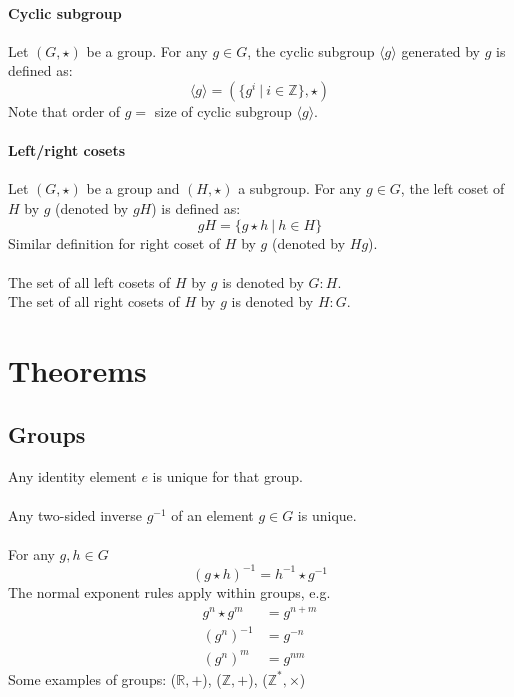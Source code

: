 \documentclass{article}
\newcommand{\R}{\mathbb{R}}
\newcommand{\Z}{\mathbb{Z}}
\begin{document}
\paragraph{Cyclic subgroup}
Let $ (G, \star) $ be a group. For any $ g \in G $, the cyclic subgroup $ \langle g \rangle $ generated by $ g $ is defined as:
\begin{equation}
\langle g \rangle = (\{g^{i} \ | \ i \in \Z \}, \star)
\end{equation}
Note that order of $ g  = $  size of cyclic subgroup $ \langle g \rangle $.
\paragraph{Left/right cosets}
Let $ (G, \star) $ be a group and $ (H, \star) $ a subgroup. For any $ g \in G $, the left coset of $ H $ by $ g $ (denoted by $ gH $) is defined as:
\begin{equation}
gH = \{g \star h \ | \ h \in H \}
\end{equation}
Similar definition for right coset of $ H $ by $ g $ (denoted by $ Hg $).
\\\\
The set of all left cosets of $ H $ by $ g $ is denoted by $ G : H $.
\\
The set of all right cosets of $ H $ by $ g $ is denoted by $ H : G $.

\section{Theorems}

\subsection{Groups}
Any identity element $ e $ is unique for that group.
\\\\
Any two-sided inverse $ g^{-1} $ of an element $ g \in G $ is unique.
\\\\
For any $g, h \in G $
\begin{equation}
(g \star h)^{-1} = h^{-1} \star g^{-1}
\end{equation}
The normal exponent rules apply within groups, e.g.
\begin{align}
g^{n} \star g^{m} & = g^{n+m} \\
(g^{n})^{-1} & = g^{-n} \\
(g^{n})^{m} & = g^{nm}
\end{align}
Some examples of groups:
($ \R, + $), ($ \Z, + $), ($ \Z^{*}, \times $)
\end{document}
